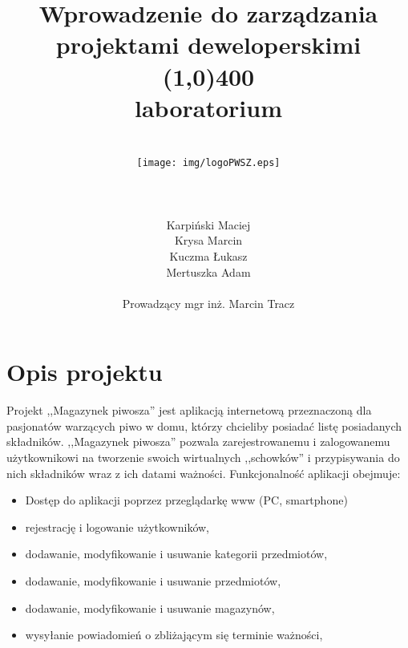 \documentclass[12pt,a4paper]{article}
\author{
	\\\texttt{[image: img/logoPWSZ.eps]} \\\\\\\\
	\hfill Karpiński Maciej\\
	\hfill Krysa Marcin\\
	\hfill Kuczma Łukasz\\
	\hfill Mertuszka Adam\\\\
	\hfill Prowadzący mgr inż. Marcin Tracz
	}
\title{\textbf{Wprowadzenie do zarządzania projektami deweloperskimi}\\\line(1,0){400}\\\textbf{laboratorium}}
\date{}
\begin{document}
	\maketitle
	\thispagestyle{fancy}
	\fancyhf{}
	\rhead{\textcolor{gray}{\footnotesize Państwowa Wyższa Szkoła Zawodowa im. Witelona w Legnicy\\Informatyka, rok III\\Semestr zimowy 2020/2021}}	
	\renewcommand{\headrulewidth}{0pt}
	\clearpage

	\pagestyle{fancy}
	\rfoot{\thepage}	
	\tableofcontents
	\newpage

	\section{Opis projektu}
		\indent Projekt ,,Magazynek piwosza'' jest aplikacją internetową przeznaczoną dla pasjonatów warzących piwo w domu, którzy chcieliby posiadać listę posiadanych składników.
		,,Magazynek piwosza'' pozwala zarejestrowanemu i zalogowanemu użytkownikowi na tworzenie swoich wirtualnych ,,schowków'' i przypisywania do nich
		składników wraz z ich datami ważności. Funkcjonalność aplikacji obejmuje:
		\begin{itemize}
			\item Dostęp do aplikacji poprzez przeglądarkę www (PC, smartphone)
			\item rejestrację i logowanie użytkowników,
			\item dodawanie, modyfikowanie i usuwanie kategorii przedmiotów,
			\item dodawanie, modyfikowanie i usuwanie przedmiotów,
			\item dodawanie, modyfikowanie i usuwanie magazynów,
			\item wysyłanie powiadomień o zbliżającym się terminie ważności,
		\end{itemize}		
	\newpage
	
\end{document}
